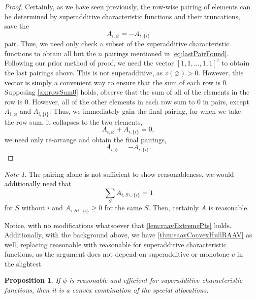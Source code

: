 \documentclass[12pt,letterpaper,final]{article}
\theoremstyle{plain}
\theoremstyle{plain}
\newtheorem{proposition}[theorem]{Proposition}
\theoremstyle{plain}
\theoremstyle{plain}
\theoremstyle{plain}
\theoremstyle{plain}
\theoremstyle{plain}
\theoremstyle{definition}
\theoremstyle{definition}
\theoremstyle{definition}
\theoremstyle{definition}
\theoremstyle{definition}
\theoremstyle{remark}
\theoremstyle{remark}
\newtheorem*{note}{Note}
\theoremstyle{remark}
\theoremstyle{remark}
\begin{document}
\begin{proof}
  Certainly, as we have seen previously, the row-wise pairing of
  elements can be determined by superadditive characteristic functions and their
  truncations, save the 
  \begin{equation}\label{eq:lastPairFound}
    A_{i,\varnothing} = -A_{i,\{i\}}
  \end{equation}
  pair. Thus, we need only check a subset of the
  superadditive characteristic functions to obtain all but the \(n\)
  pairings mentioned in \cref{eq:lastPairFound}.
  Following our prior method of proof, we need the vector
  \({\left[
    1,1,\ldots,1,1
  \right]}^t\) to obtain the last pairings above. This
  is not superadditive, as \(v(\varnothing)>0\).
  However, this vector is simply a convenient way to ensure that
  the sum of each row is 0. Supposing \cref{ax:rowSum0} holds,
  observe that the sum of all of the elements in the row is 0. However,
  all of the other elements in each row sum to 0 in pairs, except \(A_{i,\varnothing}\) and \(A_{i,\{i\}}\). Thus, we
  immediately gain the final pairing, for when we take the row sum,
  it collapses to the two elements,
  \[
    A_{i,\varnothing} + A_{i,\{i\}} = 0,
  \]
  we need only re-arrange and obtain the final pairings, 
  \[
    A_{i,\varnothing} = -A_{i,\{i\}}.
  \]
\end{proof}

\begin{note}
  The pairing alone is not sufficient to show reasonableness, we would
  additionally need that
  \[
    \sum_S A_{i,S\cup\{i\}} = 1
  \]
  for \(S\) without \(i\) and \(A_{i,S\cup\{i\}} \geq 0\) for the same
  \(S\). Then, certainly \(A\) is reasonable.
\end{note}

Notice, with no modifications whatsoever that
\cref{lem:raavExtremePts} holds. Additionally, with the background
above, we have \cref{thm:saavConvexHullRAAV} as well, replacing
reasonable with reasonable for superadditive characteristic functions, as the argument
does not depend on superadditive or monotone \(v\) in the slightest.

\begin{proposition}\label{prop:superreas-convex-combo}
  If \(\phi\) is reasonable and efficient for superadditive
  characteristic functions, then it is a convex combination of the
  special allocations.
\end{proposition}
\end{document}
